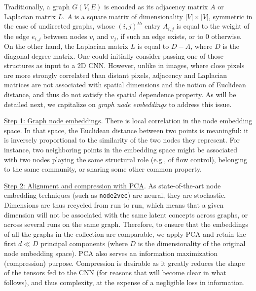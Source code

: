 \documentclass[sigconf]{acmart}
\begin{document}
\par Traditionally, a graph $G(V,E)$ is encoded as its adjacency matrix $A$ or Laplacian matrix $L$. $A$ is a square matrix of dimensionality $|V| \times |V|$, symmetric in the case of undirected graphs, whose $(i,j)^{th}$ entry $A_{i,j}$ is equal to the weight of the edge $e_{i,j}$ between nodes $v_{i}$ and $v_{j}$, if such an edge exists, or to 0 otherwise. On the other hand, the Laplacian matrix $L$ is equal to $D-A$, where $D$ is the diagonal degree matrix. One could initially consider passing one of those structures as input to a 2D CNN. However, unlike in images, where close pixels are more strongly correlated than distant pixels, adjacency and Laplacian matrices are not associated with spatial dimensions and the notion of Euclidean distance, and thus do not satisfy the spatial dependence property. As will be detailed next, we capitalize on \textit{graph node embeddings} to address this issue.\\

\vspace{-0.28cm}

\underline{Step 1: Graph node embeddings}. There is local correlation in the node embedding space. In that space, the Euclidean distance between two points is meaningful: it is inversely proportional to the similarity of the two nodes they represent. For instance, two neighboring points in the embedding space might be associated with two nodes playing the same structural role (e.g., of flow control), belonging to the same community, or sharing some other common property.\\

\vspace{-0.2cm}

\underline{Step 2: Alignment and compression with PCA}. As state-of-the-art node embedding techniques (such as \texttt{node2vec}) are neural, they are stochastic. Dimensions are thus recycled from run to run, which means that a given dimension will not be associated with the same latent concepts across graphs, or across several runs on the same graph. Therefore, to ensure that the embeddings of all the graphs in the collection are comparable, we apply PCA and retain the first $d \ll D$ principal components (where $D$ is the dimensionality of the original node embedding space). PCA also serves an information maximization (compression) purpose. Compression is desirable as it greatly reduces the shape of the tensors fed to the CNN (for reasons that will become clear in what follows), and thus complexity, at the expense of a negligible loss in information.\\
\end{document}
